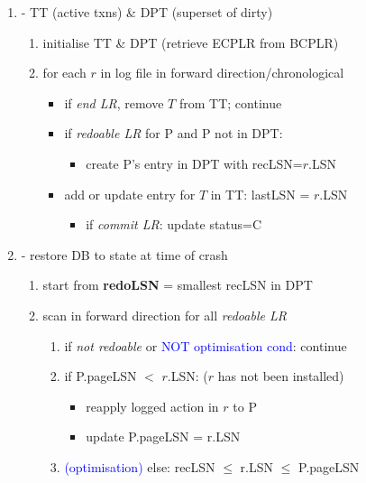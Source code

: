 \documentclass[10pt, landscape]{article}
\begin{document}
\begin{multicols*}{4}
  \begin{enumerate}
    \item {} - TT (active txns) \& DPT (superset of dirty)
      \begin{enumerate}
        \item initialise TT \& DPT (retrieve ECPLR from BCPLR)
        \item for each $r$ in log file in forward direction/chronological
          \begin{itemize}
            \item if \textit{end LR}, remove $T$ from TT; continue
            \item if \textit{redoable LR} for P and P not in DPT:
              \begin{itemize}
                \item create P's entry in DPT with recLSN=$r$.LSN
              \end{itemize}
            \item add or update entry for $T$ in TT: lastLSN = $r$.LSN
              \begin{itemize}
                \item if \textit{commit LR}: update status=C
              \end{itemize}
          \end{itemize}
      \end{enumerate}
    \item {} - restore DB to state at time of crash
      \begin{enumerate}
        \item start from \textbf{redoLSN} = smallest recLSN in DPT
        \item scan in forward direction for all \textit{redoable LR}
          \begin{enumerate}
            \item if \textit{not redoable} or \textcolor{blue}{NOT optimisation cond}: continue
            \item if P.pageLSN $<$ $r$.LSN: ($r$ has not been installed)
              \begin{itemize}
                \item reapply logged action in $r$ to P
                \item update P.pageLSN = r.LSN
              \end{itemize}
            \item \textcolor{blue}{(optimisation)} else: recLSN $\leq$ r.LSN $\leq$ P.pageLSN

\end{enumerate}
\end{enumerate}
\end{enumerate}
\end{multicols*}
\end{document}
